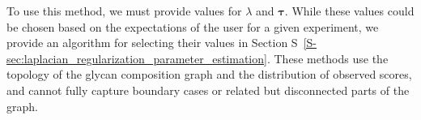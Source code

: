         To use this method, we must provide values for $\lambda$ and $\mathbf{\tau}$.
        While these values could be chosen based on the expectations of the user for
        a given experiment, we provide an algorithm for selecting their values in Section
        S~\ref{S-sec:laplacian_regularization_parameter_estimation}.
        These methods use the topology of the glycan composition graph and the
        distribution of observed scores, and cannot fully capture boundary cases
        or related but disconnected parts of the graph.
